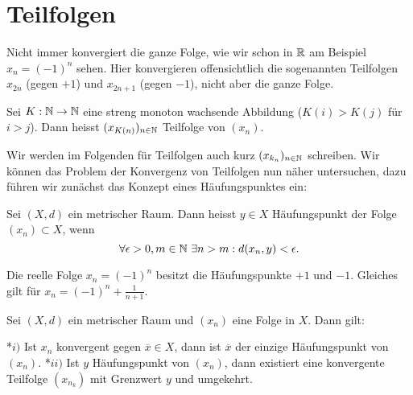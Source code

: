 \section{Teilfolgen}
\label{\detokenize{metrik/teilfolgen:teilfolgen}}\label{\detokenize{metrik/teilfolgen::doc}}
Nicht immer konvergiert die ganze Folge, wie wir schon in \(\mathbb{R}\) am Beispiel \(x_n = (-1)^n\) sehen. Hier konvergieren offensichtlich die sogenannten Teilfolgen \(x_{2n}\) (gegen \(+1\)) und \(x_{2n+1}\) (gegen \(-1\)), nicht aber die ganze Folge.
\label{metrik/teilfolgen:definition-0}
\begin{definition}{}{}



Sei \(K: \mathbb{N} \rightarrow \mathbb{N}\) eine streng monoton wachsende Abbildung (\(K(i) > K(j)\) für \(i > j\)). Dann heisst \((x_{K(n)})_{n \in \mathbb{N}}\) Teilfolge von \((x_n). \)
\end{definition}

Wir werden im Folgenden für Teilfolgen auch kurz \((x_{k_n})_{n \in \mathbb{N}}\) schreiben.
Wir können das Problem der Konvergenz von Teilfolgen nun näher untersuchen, dazu führen wir zunächst das Konzept eines Häufungspunktes ein:
\label{metrik/teilfolgen:definition-1}
\begin{definition}{}{}



Sei \((X,d)\) ein metrischer Raum. Dann heisst \(y \in X\) Häufungspunkt der Folge \((x_n) \subset X\), wenn
\begin{equation*}
 \forall \epsilon > 0, m \in \mathbb{N} ~\exists n > m: d(x_n,y) < \epsilon.
\end{equation*}\end{definition}
\label{metrik/teilfolgen:example-2}
\begin{example}{}{}



Die reelle Folge \(x_n = (-1)^n\) besitzt die Häufungspunkte \(+1\) und \(-1\). Gleiches gilt für \(x_n = (-1)^n + \frac{1}{n+1}\).
\end{example}
\label{metrik/teilfolgen:theorem-3}
\begin{theorem}{}{}



Sei \((X,d)\) ein metrischer Raum und \((x_n)\) eine Folge in \(X\). Dann gilt:

*\(i)\) Ist \(x_n\) konvergent gegen \(\overline{x} \in X\), dann ist \(\overline{x}\) der einzige Häufungspunkt von \((x_n)\).
*\(ii)\) Ist \(y\) Häufungspunkt von \((x_n)\), dann existiert eine konvergente Teilfolge \((x_{n_k})\) mit Grenzwert \(y\) und umgekehrt.
\end{theorem}

